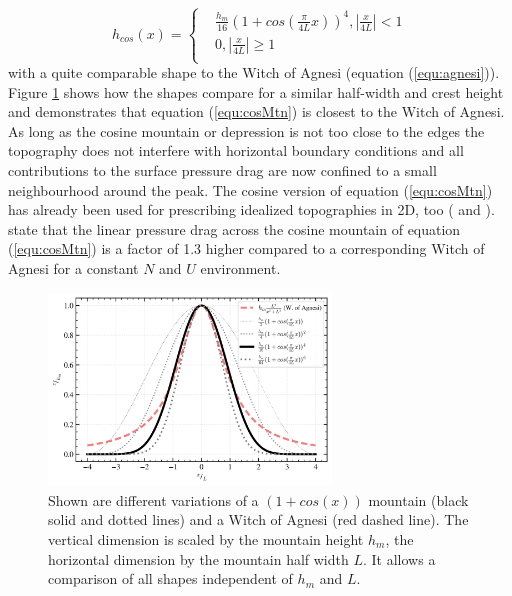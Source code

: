 \begin{equation}
    h_{cos}(x) = 
    \begin{cases}
        & \frac{h_m}{16} (1+cos(\frac{\pi}{4L}x))^4, |\frac{x}{4L}| < 1 \\
        & 0, |\frac{x}{4L}| \geq 1 \\
      \end{cases}
    \label{equ:cosMtn}
\end{equation}
with a quite comparable shape to the Witch of Agnesi (equation (\ref{equ:agnesi})). Figure \ref{fig:topo_trans} shows how the shapes compare for a similar half-width and crest height and demonstrates that equation (\ref{equ:cosMtn}) is closest to the Witch of Agnesi. As long as the cosine mountain or depression is not too close to the edges the topography does not interfere with horizontal boundary conditions and all contributions to the surface pressure drag are now confined to a small neighbourhood around the peak. The cosine version of equation (\ref{equ:cosMtn}) has already been used for prescribing idealized topographies in 2D, too (\cite[]{epifanio_three-dimensional_2001} and \cite[]{metz_are_2021}). \textcite{metz_are_2021} state that the linear pressure drag across the cosine mountain of equation (\ref{equ:cosMtn}) is a factor of 1.3 higher compared to a corresponding Witch of Agnesi for a constant $N$ and $U$ environment.
\begin{figure}[t]
    \centering
    \includegraphics[width=0.67\textwidth]{figures_model/topo-transient-boundary.png}
    \caption{Shown are different variations of a $(1+cos(x))$ mountain (black solid and dotted lines) and a Witch of Agnesi (red dashed line). The vertical dimension is scaled by the mountain height $h_m$, the horizontal dimension by the mountain half width $L$. It allows a comparison of all shapes independent of $h_m$ and $L$.}
    \label{fig:topo_trans}
\end{figure} 

